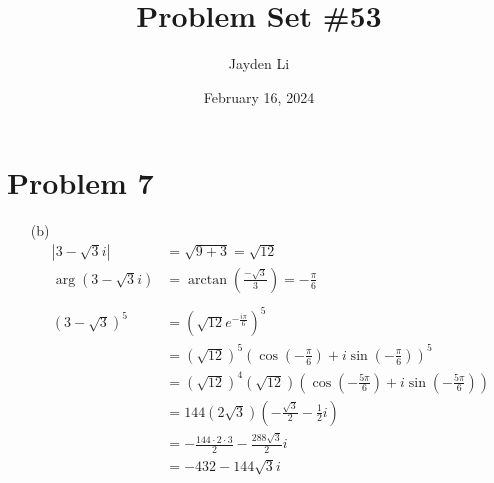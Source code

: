 \documentclass{article}
\title{Problem Set \#53}
\author{Jayden Li}
\date{February 16, 2024}
\begin{document}
\fontsize{12pt}{12pt}\selectfont
\setlength{\abovedisplayskip}{0pt}
\maketitle

\section*{Problem 7}
\begin{itemize}
\item[(b)]
	\begin{align*}
		|3-\sqrt{3}i|&=\sqrt{9+3}=\sqrt{12} \\
		\arg(3-\sqrt{3}i)&=\arctan\left(\frac{-\sqrt{3}}{3}\right)=-\frac{\pi}{6} \\
		\\
		(3-\sqrt{3})^5&=\left(\sqrt{12}e^{-\frac{i\pi}{6}}\right)^5 \\
		&=(\sqrt{12})^5\left(\cos\left(-\frac{\pi}{6}\right)+i\sin\left(-\frac{\pi}{6}\right)\right)^5 \\
		&=(\sqrt{12})^4(\sqrt{12})\left(\cos\left(-\frac{5\pi}{6}\right)+i\sin\left(-\frac{5\pi}{6}\right)\right) \\
		&=144(2\sqrt{3})\left(-\frac{\sqrt{3}}{2}-\frac{1}{2}i\right) \\
		&=-\frac{144\cdot2\cdot3}{2}-\frac{288\sqrt{3}}{2}i \\
		&=\boxed{-432-144\sqrt{3}i}
	\end{align*}	
\end{itemize}
\end{document}
